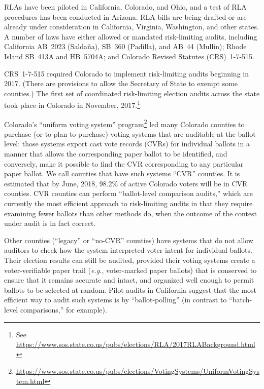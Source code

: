 \documentclass[12pt]{article}
\begin{document}
RLAs have been piloted in California, Colorado, and Ohio, and a test of
RLA procedures has been conducted in Arizona.
RLA bills are being drafted or are already under consideration in California,
Virginia, Washington, and other states.
A number of laws have either allowed or mandated risk-limiting audits,
including California AB~2023 (Salda\~{n}a), SB~360 (Padilla), and AB~44 (Mullin);
Rhode Island SB~413A and HB~5704A; and Colorado Revised Statutes (CRS)~1-7-515.

CRS~1-7-515 required 
Colorado to implement risk-limiting audits beginning in 2017.
(There are provisions to allow the Secretary of State to exempt some counties.)
The first set of coordinated risk-limiting election audits across the state took place in Colorado in November, 2017.\footnote{%
 See \url{https://www.sos.state.co.us/pubs/elections/RLA/2017RLABackground.html}
}
 

Colorado's ``uniform voting system'' program\footnote{%
\url{https://www.sos.state.co.us/pubs/elections/VotingSystems/UniformVotingSystem.html}
} led
many Colorado counties to purchase (or to plan to purchase) voting systems
that are auditable at the ballot level: those systems export cast vote records (CVRs)
for individual ballots in a manner that allows the corresponding paper ballot to be identified,
and conversely, make it possible to find the CVR corresponding to any
particular paper ballot.
We call counties that have such systems ``CVR'' counties.
It is estimated that by June, 2018, 98.2\% of active Colorado voters will be in CVR counties.
CVR counties can perform ``ballot-level comparison audits,'' \citep{lindemanStark12} 
which are currently the
most efficient approach to risk-limiting audits in that they require examining
fewer ballots than other methods do, when the outcome of the contest under audit 
is in fact correct.

Other counties (``legacy'' or ``no-CVR'' counties) 
have systems that do not allow auditors to check how the system
interpreted voter intent for individual ballots.
Their election results can still be audited, provided their voting systems
create a voter-verifiable paper trail (\emph{e.g.}, voter-marked paper ballots) that is
conserved to ensure that it remains accurate and intact, and organized well enough
to permit ballots to be selected at random.
Pilot audits in California suggest that the most efficient way to audit such systems
is by ``ballot-polling'' \citep{lindemanEtal12,lindemanStark12} 
(in contrast to ``batch-level comparisons,'' for example).
\end{document}
